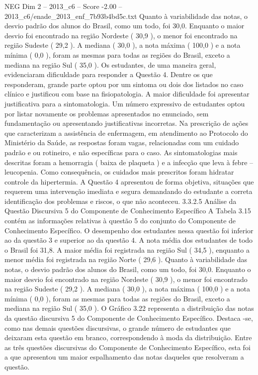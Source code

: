 \begin{textsample}{NEG Dim 2 – 2013\_c6 – Score -2.00 – 2013\_c6/enade\_2013\_enf\_7b93b4bd5c.txt}
Quanto à variabilidade das notas, o desvio padrão dos alunos do Brasil, como um todo, foi 30,0.
Enquanto o maior desvio foi encontrado na região Nordeste ( 30,9 ), o menor foi encontrado na região Sudeste ( 29,2 ).
A mediana ( 30,0 ), a nota máxima ( 100,0 ) e a nota mínima ( 0,0 ), foram as mesmas para todas as regiões do Brasil, exceto a mediana na região Sul ( 35,0 ).
Os estudantes, de uma maneira geral, evidenciaram dificuldade para responder a Questão 4.
Dentre os que responderam, grande parte optou por um sintoma ou dois dos listados no caso clínico e justificou com base na fisiopatologia.
A maior dificuldade foi apresentar justificativa para a sintomatologia.
Um número expressivo de estudantes optou por listar novamente os problemas apresentados no enunciado, sem fundamentação ou apresentando justificativas incorretas.
Na prescrição de ações que caracterizam a assistência de enfermagem, em atendimento ao Protocolo do Ministério da Saúde, as respostas foram vagas, relacionadas com um cuidado padrão e ou rotineiro, e não específicas para o caso.
As sintomatologias mais descritas foram a hemorragia ( baixa de plaqueta ) e a infecção que leva à febre – leucopenia.
Como consequência, os cuidados mais prescritos foram hidratar controle da hipertermia.
A Questão 4 apresentou de forma objetiva, situações que requerem uma intervenção imediata e segura demandando do estudante a correta identificação dos problemas e riscos, o que não aconteceu. 3.3.2.5 Análise da Questão Discursiva 5 do Componente de Conhecimento Específico A Tabela 3.15 contém as informações relativas à questão 5 do conjunto do Componente de Conhecimento Específico.
O desempenho dos estudantes nessa questão foi inferior ao da questão 3 e superior ao da questão 4.
A nota média dos estudantes de todo o Brasil foi 31,8.
A maior média foi registrada na região Sul ( 34,5 ), enquanto a menor média foi registrada na região Norte ( 29,6 ).
Quanto à variabilidade das notas, o desvio padrão dos alunos do Brasil, como um todo, foi 30,0.
Enquanto o maior desvio foi encontrado na região Nordeste ( 30,9 ), o menor foi encontrado na região Sudeste ( 29,2 ).
A mediana ( 30,0 ), a nota máxima ( 100,0 ) e a nota mínima ( 0,0 ), foram as mesmas para todas as regiões do Brasil, exceto a mediana na região Sul ( 35,0 ).
O Gráfico 3.22 representa a distribuição das notas da questão discursiva 5 do Componente de Conhecimento Específico.
Destaca -se, como nas demais questões discursivas, o grande número de estudantes que deixaram esta questão em branco, correspondendo à moda da distribuição.
Entre as três questões discursivas do Componente de Conhecimento Específico, esta foi a que apresentou um maior espalhamento das notas daqueles que resolveram a questão.

\end{textsample}
